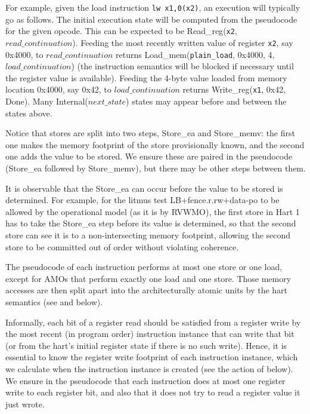 \begin{commentary}
For example, given the load instruction \verb!lw x1,0(x2)!,
an execution will typically go as follows.
The initial execution state will be computed from the pseudocode for the given opcode.
This can be expected to be {\sc Read\_reg}({\tt x2}, $read\_continuation$).
Feeding the most recently written value of register {\tt x2}, say 0x4000, to $read\_continuation$ returns
{\sc Load\_mem}({\tt plain\_load}, 0x4000, 4, $load\_continuation$)
(the instruction semantics will be blocked
if necessary until the register value is available).
Feeding the 4-byte value loaded from memory location 0x4000, say 0x42, to $load\_continuation$ returns
{\sc Write\_reg}({\tt x1}, 0x42, {\sc Done}).
Many {\sc Internal}($next\_state$) states may appear before and between the states above.
\end{commentary}

Notice that stores are split into two steps, {\sc Store\_ea} and {\sc Store\_memv}: the first one makes the memory footprint of the store provisionally known, and the second one adds the value to be stored.
We ensure these are paired in the pseudocode ({\sc Store\_ea} followed by {\sc Store\_memv}), but there may be other steps between them.
\begin{commentary}
It is observable that the {\sc Store\_ea} can occur before the value to be stored is determined.
For example, for the litmus test LB+fence.r.rw+data-po to be allowed by the operational model (as it is by RVWMO), the first store in Hart 1 has to take the {\sc Store\_ea} step before its value is determined, so that the second store can see it is to a non-intersecting memory footprint, allowing the second store to be committed out of order without violating coherence.
\end{commentary}

The pseudocode of each instruction performs at most one store or one load, except for AMOs that perform exactly one load and one store.
Those memory accesses are then split apart into the architecturally atomic units by the hart semantics (see  and  below).

Informally, each bit of a register read should be satisfied from a register write by the most recent (in program order) instruction instance that can write that bit (or from the hart's initial register state if there is no such write).
Hence, it is essential to know the register write footprint of each instruction instance, which we calculate when the instruction instance is created (see the action of  below).
We ensure in the pseudocode that each instruction does at most one register write to each register bit, and also that it does not try to read a register value it just wrote.

